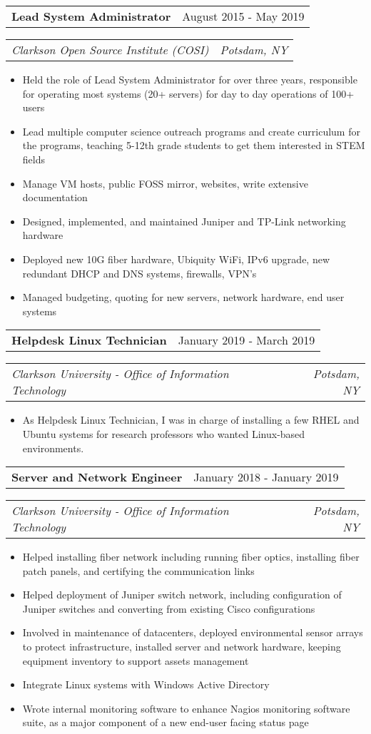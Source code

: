 \documentclass[letterpaper,12pt]{article}
\makeatletter
\newcommand{\resitem}[1]{\item #1 \vspace{-3pt}}
\newcommand{\topheading}[2]{
\begin{tabular*}{6.5in}{l@{\extracolsep{\fill}}r}
		\textbf{#1} & #2 \\
\end{tabular*}}
\newcommand{\bottomheading}[2]{
\begin{tabular*}{6.5in}{l@{\extracolsep{\fill}}r}
		\textit{#1} & \textit{#2} \\
\end{tabular*}\vspace{-6pt}}
\makeatother
\begin{document}
\begin{itemize}
	\topheading{Lead System Administrator}{August 2015 - May 2019}
	\bottomheading{Clarkson Open Source Institute (COSI)}{Potsdam, NY}
	\begin{itemize}
		\resitem{Held the role of Lead System Administrator for over three years, responsible for operating most systems (20+ servers) for day to day operations of 100+ users}
		\resitem{Lead multiple computer science outreach programs and create curriculum for the programs, teaching 5-12th grade students to get them interested in STEM fields}
		\resitem{Manage VM hosts, public FOSS mirror, websites, write extensive documentation}
		\resitem{Designed, implemented, and maintained Juniper and TP-Link networking hardware}
		\resitem{Deployed new 10G fiber hardware, Ubiquity WiFi, IPv6 upgrade, new redundant DHCP and DNS systems, firewalls, VPN's}
		\resitem{Managed budgeting, quoting for new servers, network hardware, end user systems}
	\end{itemize}

	\newpage

	\topheading{Helpdesk Linux Technician}{January 2019 - March 2019}
	\bottomheading{Clarkson University - Office of Information Technology}{Potsdam, NY}
	\begin{itemize}
		\resitem{As Helpdesk Linux Technician, I was in charge of installing a few RHEL and Ubuntu systems for research professors who wanted Linux-based environments.}
	\end{itemize}

	\topheading{Server and Network Engineer}{January 2018 - January 2019}
	\bottomheading{Clarkson University - Office of Information Technology}{Potsdam, NY}
	\begin{itemize}
		\resitem{Helped installing fiber network including running fiber optics, installing fiber patch panels, and certifying the communication links}
		\resitem{Helped deployment of Juniper switch network, including configuration of Juniper switches and converting from existing Cisco configurations}
		\resitem{Involved in maintenance of datacenters, deployed environmental sensor arrays to protect infrastructure, installed server and network hardware, keeping equipment inventory to support assets management}
		\resitem{Integrate Linux systems with Windows Active Directory}
		\resitem{Wrote internal monitoring software to enhance Nagios monitoring software suite, as a major component of a new end-user facing status page}
	\end{itemize}


\end{itemize}
\end{document}

